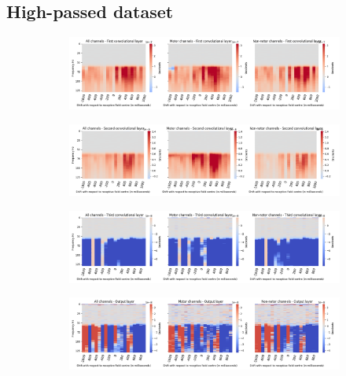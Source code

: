 \subsection*{High-passed dataset}\label{subsec:vel-high-passed-dataset-appendixC}
\begin{figure}[!htpb]
\centering
\begin{subfigure}[b]{\textwidth}
   \includegraphics[width=0.9\linewidth]{img/appendix/C/hp-m/vel/sbp0_hp_m_shift_gradients_conv_2_all_kinds}
   \caption{}
   \label{fig:vel-hp-shifting-grads-conv-2}
\end{subfigure}

\begin{subfigure}[b]{\textwidth}
   \includegraphics[width=0.9\linewidth]{img/appendix/C/hp-m/vel/sbp0_hp_m_shift_gradients_conv_3_all_kinds}
   \caption{}
   \label{fig:vel-hp-shifting-grads-conv-3}
\end{subfigure}

\begin{subfigure}[b]{\textwidth}
   \includegraphics[width=0.9\linewidth]{img/appendix/C/hp-m/vel/sbp0_hp_m_shift_gradients_conv_4_all_kinds}
   \caption{}
   \label{fig:vel-hp-shifting-grads-conv-4}
\end{subfigure}

\begin{subfigure}[b]{\textwidth}
   \includegraphics[width=0.9\linewidth]{img/appendix/C/hp-m/vel/sbp0_hp_m_shift_gradients_conv_classifier_all_kinds}
   \caption{}
   \label{fig:vel-hp-shifting-grads-conv-classifier}
\end{subfigure}


\end{figure}

